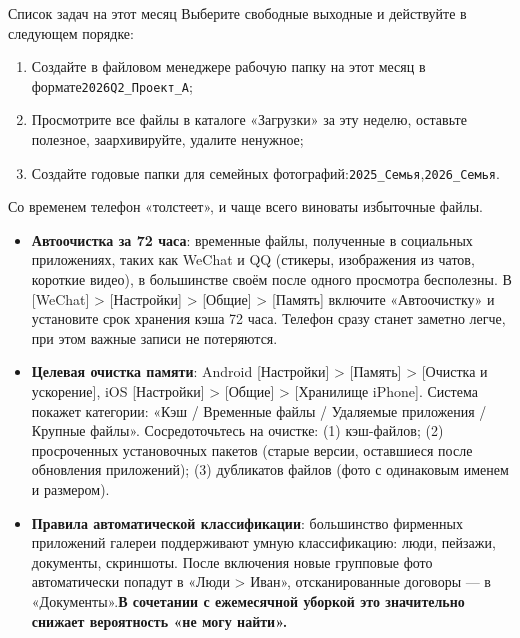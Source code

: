 \begin{tcbpractice}{Список задач на этот месяц}
Выберите свободные выходные и действуйте в следующем порядке:

\begin{enumerate}
  \item Создайте в файловом менеджере рабочую папку на этот месяц в формате\texttt{2026Q2\_Проект\_А};
  \item Просмотрите все файлы в каталоге «Загрузки» за эту неделю, оставьте полезное, заархивируйте, удалите ненужное;
  \item Создайте годовые папки для семейных фотографий:\texttt{2025\_Семья},\texttt{2026\_Семья}.
\end{enumerate}

\end{tcbpractice}


Со временем телефон «толстеет», и чаще всего виноваты избыточные файлы.

\begin{itemize}
  \item \textbf{Автоочистка за 72 часа}: временные файлы, полученные в социальных приложениях, таких как WeChat и QQ (стикеры, изображения из чатов, короткие видео), в большинстве своём после одного просмотра бесполезны. В [WeChat] > [Настройки] > [Общие] > [Память] включите «Автоочистку» и установите срок хранения кэша 72 часа. Телефон сразу станет заметно легче, при этом важные записи не потеряются.
  \item \textbf{Целевая очистка памяти}: Android [Настройки] > [Память] > [Очистка и ускорение], iOS [Настройки] > [Общие] > [Хранилище iPhone]. Система покажет категории: «Кэш / Временные файлы / Удаляемые приложения / Крупные файлы». Сосредоточьтесь на очистке: (1) кэш-файлов; (2) просроченных установочных пакетов (старые версии, оставшиеся после обновления приложений); (3) дубликатов файлов (фото с одинаковым именем и размером).
  \item \textbf{Правила автоматической классификации}: большинство фирменных приложений галереи поддерживают умную классификацию: люди, пейзажи, документы, скриншоты. После включения новые групповые фото автоматически попадут в «Люди > Иван», отсканированные договоры — в «Документы».\textbf{В сочетании с ежемесячной уборкой это значительно снижает вероятность «не могу найти».}
\end{itemize}


